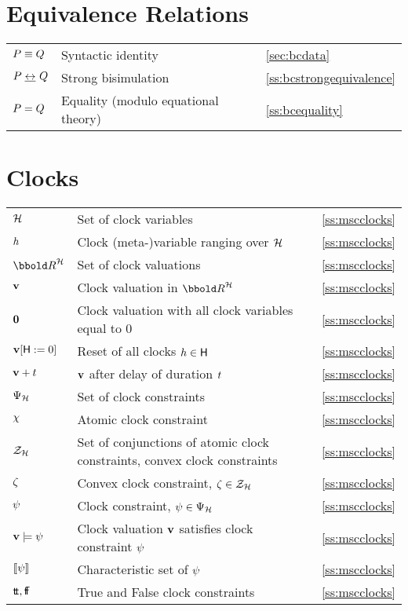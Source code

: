 {\begin{tabular}{l>{\raggedright}p{.5\linewidth}<{}l}
\end{tabular}

\section*{Equivalence Relations}
\begin{tabular}{l>{\raggedright}p{.5\linewidth}<{}l}
${P} \equiv {Q}$ & Syntactic identity & \ref{sec:bcdata} \\
${P} \mathrel{\underline{\leftrightarrow}^{}_{}} {Q}$ & Strong bisimulation & \ref{ss:bcstrongequivalence} \\
${P} = {Q}$ & Equality (modulo equational theory) & \ref{ss:bcequality} \\
\end{tabular}

\section*{Clocks}
\begin{tabular}{l>{\raggedright}p{.5\linewidth}<{}l}
$\clocks$ & Set of clock variables & \ref{ss:mscclocks} \\
$h$ & Clock \mbox{(meta-)}variable ranging over $\clocks$ & \ref{ss:mscclocks} \\  
$\clkvls$ & Set of clock valuations & \ref{ss:mscclocks} \\
$\mathbf{v}$ & Clock valuation in $\clkvls$ & \ref{ss:mscclocks} \\
$\mathbf{0}$ & Clock valuation with all clock variables equal to 0 & \ref{ss:mscclocks} \\
$\mathbf{v}[{\sf H}:=0]$ & Reset of all clocks $h \in {\sf H}$ & \ref{ss:mscclocks} \\
$\mathbf{v} + {t}$ & $\mathbf{v}$ after delay of duration ${t}$ & \ref{ss:mscclocks} \\
$\ClockConstraints$ & Set of clock constraints & \ref{ss:mscclocks} \\
${\chi}$ & Atomic clock constraint & \ref{ss:mscclocks} \\
$\ClockZones$ & Set of conjunctions of atomic clock constraints, convex clock constraints & \ref{ss:mscclocks} \\
${\zeta}$ & Convex clock constraint, $\vexcond \in \ClockZones$ & \ref{ss:mscclocks} \\
${\psi}$ & Clock constraint, $\clkcond \in \ClockConstraints$ & \ref{ss:mscclocks} \\
$\mathbf{v} \models {\psi}$ & Clock valuation $\mathbf{v}$ satisfies clock constraint ${\psi}$ & \ref{ss:mscclocks} \\
${\lbrack\!\lbrack}{\psi}{\rbrack\!\rbrack}$ & Characteristic set of ${\psi}$ & \ref{ss:mscclocks} \\
$\text{\sf t\!t}, \text{\sf f\!f}$ & True and False clock constraints & \ref{ss:mscclocks} \\
\end{tabular}
\vfil

}
